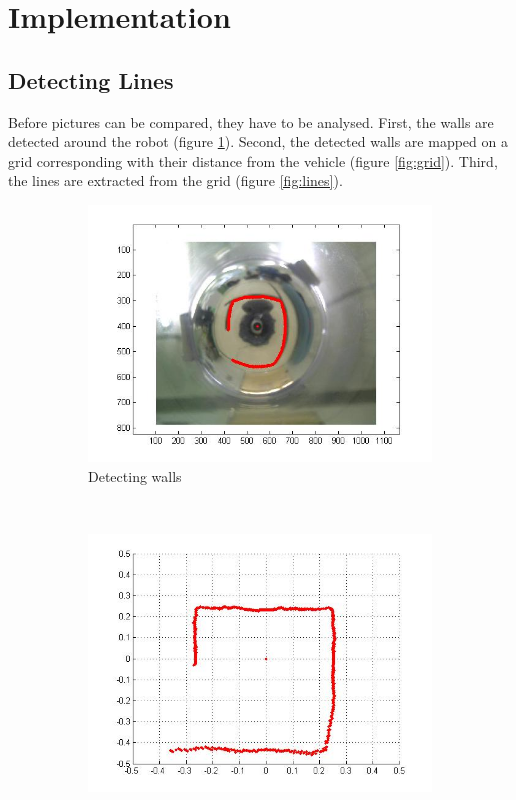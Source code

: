 \documentclass[12pt]{article}
\begin{document}
\clearpage

\section{Implementation}
\subsection{Detecting Lines}
Before pictures can be compared, they have to be analysed. First, the walls are detected around the robot (figure \ref{fig:points}). Second, the detected walls are mapped on a grid corresponding with their distance from the vehicle (figure \ref{fig:grid}). Third, the lines are extracted from the grid (figure \ref{fig:lines}). \\
\begin{figure}[h!]
	\centering
	\begin{subfigure}[b]{0.3\textwidth}
            \includegraphics[width=\textwidth]{points.jpg}
            \caption{Detecting walls}
            \label{fig:points}
    \end{subfigure}
    ~
    \begin{subfigure}[b]{0.3\textwidth}
            \includegraphics[width=\textwidth]{grid.jpg}

\end{subfigure}
\end{figure}
\end{document}
